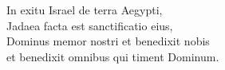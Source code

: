 
In exitu Israel de terra Aegypti,\\
Jadaea facta est sanctificatio eius,\\
Dominus memor nostri et benedixit nobis\\
et benedixit omnibus qui timent Dominum.
